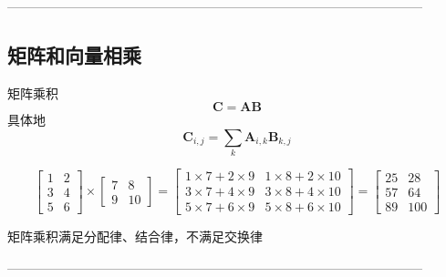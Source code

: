 \documentclass{article}
\begin{document}
--------------------------------------------------------------------------------------------------

\subsection{矩阵和向量相乘}
矩阵乘积
\begin{equation}
    \boldsymbol{C}=\boldsymbol{A}\boldsymbol{B}
\end{equation}
具体地
\begin{equation}
    \mathbf{C}_{i,j}=\sum_{k}\mathbf{A}_{i,k}\mathbf{B}_{k,j}
\end{equation}

\[
\begin{bmatrix}
1 & 2 \\
3 & 4 \\
5 & 6
\end{bmatrix}
\times
\begin{bmatrix}
7 & 8 \\
9 & 10
\end{bmatrix}
=
\begin{bmatrix}
1 \times 7 + 2 \times 9 & 1 \times 8 + 2 \times 10 \\
3 \times 7 + 4 \times 9 & 3 \times 8 + 4 \times 10 \\
5 \times 7 + 6 \times 9 & 5 \times 8 + 6 \times 10
\end{bmatrix}
=
\begin{bmatrix}
25 & 28 \\
57 & 64 \\
89 & 100
\end{bmatrix}
\]

矩阵乘积满足分配律、结合律，不满足交换律

--------------------------------------------------------------------------------------------------
\end{document}
